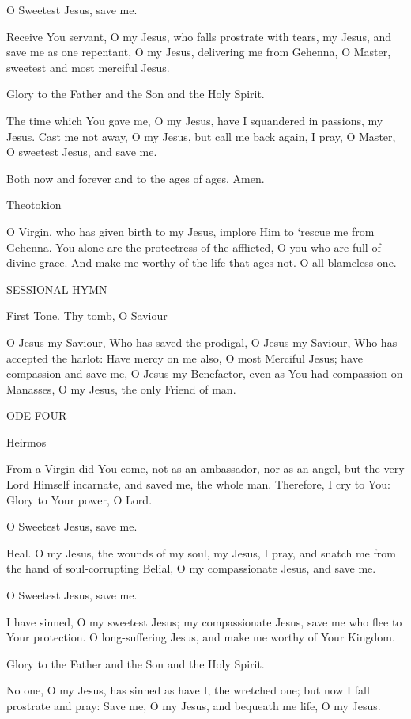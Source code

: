 O Sweetest Jesus, save me.

Receive You servant, O my Jesus, who falls prostrate with tears, my
Jesus, and save me as one repentant, O my Jesus, delivering me from
Gehenna, O Master, sweetest and most merciful Jesus.

Glory to the Father and the Son and the Holy Spirit.

The time which You gave me, O my Jesus, have I squandered in passions,
my Jesus. Cast me not away, O my Jesus, but call me back again, I pray,
O Master, O sweetest Jesus, and save me.

Both now and forever and to the ages of ages. Amen.

Theotokion

O Virgin, who has given birth to my Jesus, implore Him to `rescue me
from Gehenna. You alone are the protectress of the afflicted, O you who
are full of divine grace. And make me worthy of the life that ages not.
O all-blameless one.

SESSIONAL HYMN

First Tone. Thy tomb, O Saviour

O Jesus my Saviour, Who has saved the prodigal, O Jesus my Saviour, Who
has accepted the harlot: Have mercy on me also, O most Merciful Jesus;
have compassion and save me, O Jesus my Benefactor, even as You had
compassion on Manasses, O my Jesus, the only Friend of man.

ODE FOUR

Heirmos

From a Virgin did You come, not as an ambassador, nor as an angel, but
the very Lord Himself incarnate, and saved me, the whole man. Therefore,
I cry to You: Glory to Your power, O Lord.

O Sweetest Jesus, save me.

Heal. O my Jesus, the wounds of my soul, my Jesus, I pray, and snatch me
from the hand of soul-corrupting Belial, O my compassionate Jesus, and
save me.

O Sweetest Jesus, save me.

I have sinned, O my sweetest Jesus; my compassionate Jesus, save me who
flee to Your protection. O long-suffering Jesus, and make me worthy of
Your Kingdom.

Glory to the Father and the Son and the Holy Spirit.

No one, O my Jesus, has sinned as have I, the wretched one; but now I
fall prostrate and pray: Save me, O my Jesus, and bequeath me life, O my
Jesus.

